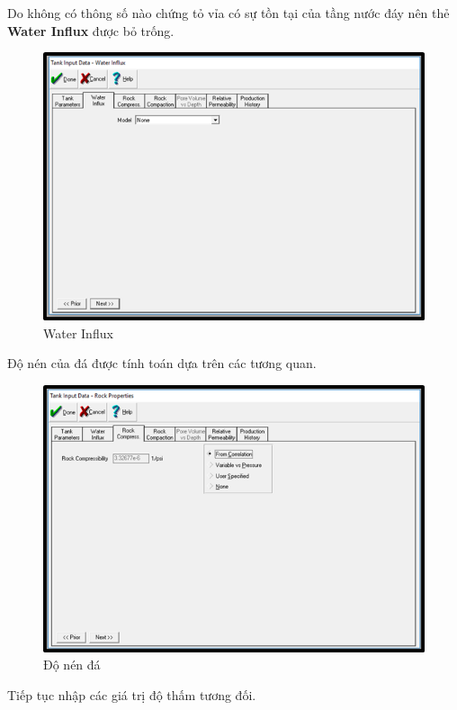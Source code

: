 \documentclass[12pt,a4paper]{report}
\begin{document}
        \clearpage
        \noindent
Do không có thông số nào chứng tỏ vỉa có sự tồn tại của tầng nước đáy nên thẻ \textbf{Water Influx} được bỏ trống.
		\begin{figure}[h]
        	\centering
            \includegraphics[scale=1]{Fig/water_influx.png}
            \caption{Water Influx}
            \label{fig:water_influx}
        \end{figure}
        \clearpage
        \noindent
Độ nén của đá được tính toán dựa trên các tương quan.
		\begin{figure}[h]
        	\centering
            \includegraphics[scale=1]{Fig/compress.png}
            \caption{Độ nén đá}
            \label{fig:compress}
        \end{figure}
        \clearpage
        \noindent
Tiếp tục nhập các giá trị độ thấm tương đối.
\end{document}
